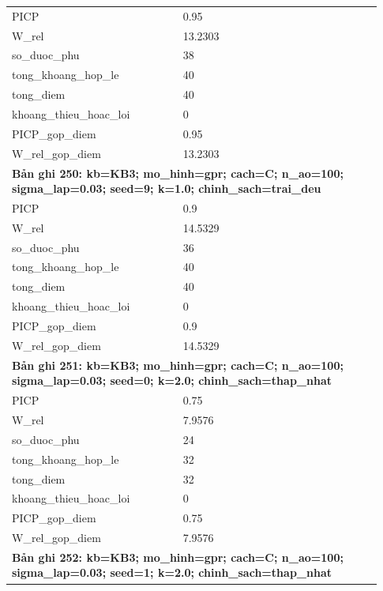 \begin{longtable}{p{0.43\linewidth}p{0.50\linewidth}}
PICP & 0.95 \\
W\_\allowbreak rel & 13.2303 \\
so\_\allowbreak duoc\_\allowbreak phu & 38 \\
tong\_\allowbreak khoang\_\allowbreak hop\_\allowbreak le & 40 \\
tong\_\allowbreak diem & 40 \\
khoang\_\allowbreak thieu\_\allowbreak hoac\_\allowbreak loi & 0 \\
PICP\_\allowbreak gop\_\allowbreak diem & 0.95 \\
W\_\allowbreak rel\_\allowbreak gop\_\allowbreak diem & 13.2303 \\
\midrule
\multicolumn{2}{p{0.95\linewidth}}{\textbf{Bản ghi 250: kb=KB3; mo\_hinh=gpr; cach=C; n\_ao=100; sigma\_lap=0.03; seed=9; k=1.0; chinh\_sach=trai\_deu}} \\
PICP & 0.9 \\
W\_\allowbreak rel & 14.5329 \\
so\_\allowbreak duoc\_\allowbreak phu & 36 \\
tong\_\allowbreak khoang\_\allowbreak hop\_\allowbreak le & 40 \\
tong\_\allowbreak diem & 40 \\
khoang\_\allowbreak thieu\_\allowbreak hoac\_\allowbreak loi & 0 \\
PICP\_\allowbreak gop\_\allowbreak diem & 0.9 \\
W\_\allowbreak rel\_\allowbreak gop\_\allowbreak diem & 14.5329 \\
\midrule
\multicolumn{2}{p{0.95\linewidth}}{\textbf{Bản ghi 251: kb=KB3; mo\_hinh=gpr; cach=C; n\_ao=100; sigma\_lap=0.03; seed=0; k=2.0; chinh\_sach=thap\_nhat}} \\
PICP & 0.75 \\
W\_\allowbreak rel & 7.9576 \\
so\_\allowbreak duoc\_\allowbreak phu & 24 \\
tong\_\allowbreak khoang\_\allowbreak hop\_\allowbreak le & 32 \\
tong\_\allowbreak diem & 32 \\
khoang\_\allowbreak thieu\_\allowbreak hoac\_\allowbreak loi & 0 \\
PICP\_\allowbreak gop\_\allowbreak diem & 0.75 \\
W\_\allowbreak rel\_\allowbreak gop\_\allowbreak diem & 7.9576 \\
\midrule
\multicolumn{2}{p{0.95\linewidth}}{\textbf{Bản ghi 252: kb=KB3; mo\_hinh=gpr; cach=C; n\_ao=100; sigma\_lap=0.03; seed=1; k=2.0; chinh\_sach=thap\_nhat}} \\

\end{longtable}
